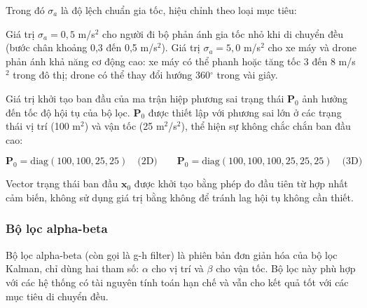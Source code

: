 Trong đó $\sigma_a$ là độ lệch chuẩn gia tốc, hiệu chỉnh theo loại mục tiêu:

\begin{table}[H]
\centering
\caption{Tham số nhiễu quá trình $\sigma_a$ theo loại mục tiêu}
\label{tab:process-noise}
\end{table}

Giá trị $\sigma_a = 0{,}5$ m/s$^2$ cho người đi bộ phản ánh gia tốc nhỏ khi di chuyển đều (bước chân khoảng 0,3 đến 0,5 m/s$^2$). Giá trị $\sigma_a = 5{,}0$ m/s$^2$ cho xe máy và drone phản ánh khả năng cơ động cao: xe máy có thể phanh hoặc tăng tốc 3 đến 8 m/s$^2$ trong đô thị; drone có thể thay đổi hướng 360$^\circ$ trong vài giây.

Giá trị khởi tạo ban đầu của ma trận hiệp phương sai trạng thái $\mathbf{P}_0$ ảnh hưởng đến tốc độ hội tụ của bộ lọc. $\mathbf{P}_0$ được thiết lập với phương sai lớn ở các trạng thái vị trí (100 m$^2$) và vận tốc (25 m$^2$/s$^2$), thể hiện sự không chắc chắn ban đầu cao:

\begin{equation}
\mathbf{P}_0 = \text{diag}(100, 100, 25, 25) \quad \text{(2D)} \qquad \mathbf{P}_0 = \text{diag}(100, 100, 100, 25, 25, 25) \quad \text{(3D)}
\end{equation}

Vector trạng thái ban đầu $\mathbf{x}_0$ được khởi tạo bằng phép đo đầu tiên từ hợp nhất cảm biến, không sử dụng giá trị bằng không để tránh lag hội tụ không cần thiết.

\subsubsection{Bộ lọc alpha-beta}

\hspace{0.5cm} Bộ lọc alpha-beta (còn gọi là g-h filter) là phiên bản đơn giản hóa của bộ lọc Kalman, chỉ dùng hai tham số: $\alpha$ cho vị trí và $\beta$ cho vận tốc. Bộ lọc này phù hợp với các hệ thống có tài nguyên tính toán hạn chế và vẫn cho kết quả tốt với các mục tiêu di chuyển đều.

